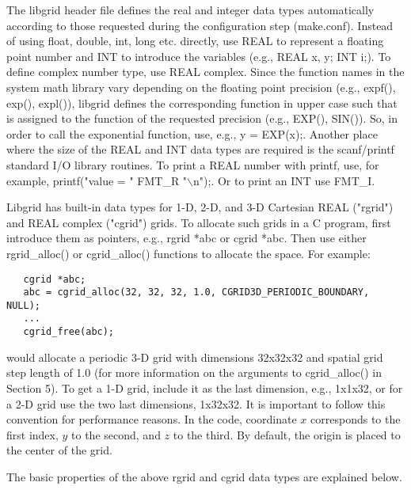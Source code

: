 \documentclass[12pt,letterpaper]{report}
\begin{document}
The libgrid header file defines the real and integer data types automatically according to those requested during the configuration step (make.conf). Instead of using float, double, int, long etc. directly, use REAL to represent a floating point number and INT to introduce the variables (e.g., REAL x, y; INT i;). To define complex number type, use REAL complex. Since the function names in the system math library vary depending on the floating point precision (e.g., expf(), exp(), expl()), libgrid defines the corresponding function in upper case such that is assigned to the function of the requested precision (e.g., EXP(), SIN()). So, in order to call the exponential function, use, e.g., y = EXP(x);. Another place where the size of the REAL and INT data types are required is the scanf/printf standard I/O library routines. To print a REAL number with printf, use, for example, printf("value = " FMT\_R "$\backslash$n");. Or to print an INT use FMT\_I.

Libgrid has built-in data types for 1-D, 2-D, and 3-D Cartesian REAL ("rgrid") and REAL complex ("cgrid") grids. To allocate such grids in a C program, first introduce them as pointers, e.g., rgrid *abc or cgrid *abc. Then use either rgrid\_alloc() or cgrid\_alloc() functions to allocate the space. For example:
\begin{verbatim}
   cgrid *abc;
   abc = cgrid_alloc(32, 32, 32, 1.0, CGRID3D_PERIODIC_BOUNDARY, NULL);
   ...
   cgrid_free(abc);
\end{verbatim}
would allocate a periodic 3-D grid with dimensions 32x32x32 and spatial grid step length of 1.0 (for more information on the arguments to cgrid\_alloc() in Section 5). To get a 1-D grid, include it as the last dimension, e.g., 1x1x32, or for a 2-D grid use the two last dimensions, 1x32x32. It is important to follow this convention for performance reasons. In the code, coordinate $x$ corresponds to the first index, $y$ to the second, and $z$ to the third. By default, the origin is placed to the center of the grid.

The basic properties of the above rgrid and cgrid data types are explained below.
\end{document}
